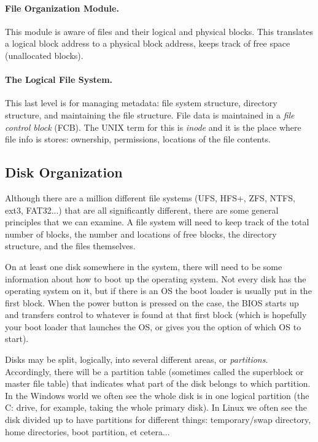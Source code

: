 \paragraph{File Organization Module.} This module is aware of files and their logical and physical blocks. This translates a logical block address to a physical block address, keeps track of free space (unallocated blocks).

\paragraph{The Logical File System.} This last level is for managing metadata: file system structure, directory structure, and maintaining the file structure. File data is maintained in a \textit{file control block} (FCB). The UNIX term for this is \textit{inode} and it is the place where file info is stores: ownership, permissions, locations of the file contents.

\subsection*{Disk Organization}

Although there are a million different file systems (UFS, HFS+, ZFS, NTFS, ext3, FAT32...) that are all significantly different, there are some general principles that we can examine. A file system will need to keep track of the total number of blocks, the number and locations of free blocks, the directory structure, and the files themselves.

On at least one disk somewhere in the system, there will need to be some information about how to boot up the operating system. Not every disk has the operating system on it, but if there is an OS the boot loader is usually put in the first block. When the power button is pressed on the case, the BIOS starts up and transfers control to whatever is found at that first block (which is hopefully your boot loader that launches the OS, or gives you the option of which OS to start).

Disks may be split, logically, into several different areas, or \textit{partitions}. Accordingly, there will be a partition table (sometimes called the superblock or master file table) that indicates what part of the disk belongs to which partition. In the Windows world we often see the whole disk is in one logical partition (the C: drive, for example, taking the whole primary disk). In Linux we often see the disk divided up to have partitions for different things: temporary/swap directory, home directories, boot partition, et cetera...



